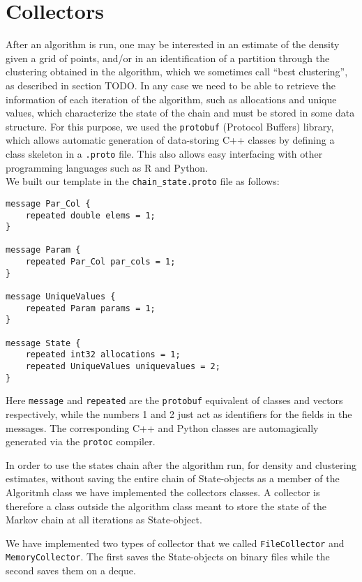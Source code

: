 \section{Collectors}\label{collectors}
After an algorithm is run, one may be interested in an estimate of the density given a grid of points, and/or in an identification of a partition through the clustering obtained in the algorithm, which we sometimes call ``best clustering'', as described in section TODO.
In any case we need to be able to retrieve the information of each iteration of the algorithm, such as allocations and unique values, which characterize the state of the chain and must be stored in some data structure.
For this purpose, we used the \verb|protobuf| (Protocol Buffers) library, which allows automatic generation of data-storing C++ classes by defining a class skeleton in a \verb|.proto| file.
This also allows easy interfacing with other programming languages such as R and Python. \\
We built our template in the \verb|chain_state.proto| file as follows:
\begin{verbatim}
message Par_Col {
    repeated double elems = 1;
}

message Param {
    repeated Par_Col par_cols = 1;
}

message UniqueValues {
    repeated Param params = 1;
}

message State {
    repeated int32 allocations = 1;
    repeated UniqueValues uniquevalues = 2;
}
\end{verbatim}
Here \verb|message| and \verb|repeated| are the \verb|protobuf| equivalent of classes and vectors respectively, while the numbers 1 and 2 just act as identifiers for the fields in the messages.
The corresponding C++ and Python classes are automagically generated via the \verb|protoc| compiler.


In order to use the states chain after the algorithm run, for density and clustering estimates, without saving the entire chain of State-objects as a member of the Algoritmh class we have implemented the collectors classes. 
A collector is therefore a class outside the algorithm class meant to store the state of the Markov chain at all iterations as State-object.


We have implemented two types of collector that we called \verb|FileCollector| and \verb|MemoryCollector|.
The first saves the State-objects on binary files while the second saves them on a deque.

